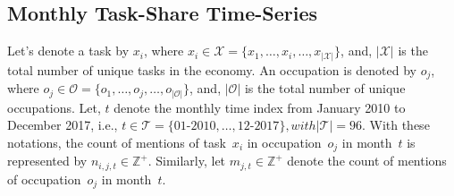 \documentclass[letterpaper]{article} %
\begin{document}
\subsection{Monthly Task-Share Time-Series}
\label{subsec:monthly_taskshare}
Let's denote a task by $x_i$, where $x_i \in \mathcal{X} = \{ x_1, \hdots, x_i, \hdots, x_{|\mathcal{X}|}\}$, and, $|\mathcal{X}|$ is the total number of unique tasks in the economy. An occupation is denoted by $o_j$, where $o_j \in \mathcal{O} = \{ o_1, \hdots, o_j, \hdots, o_{|\mathcal{O}|}\}$, and, $|\mathcal{O}|$ is the total number of unique occupations. Let, $t$ denote the monthly time index from January 2010 to December 2017, i.e., $t \in \mathcal{T} = \{ 01\text{-}2010, \hdots, 12\text{-}2017 \}, with |\mathcal{T}|=96 $. With these notations, the count of mentions of task~$x_i$ in occupation~$o_j$ in month~$t$ is represented by $n_{i,j,t} \in \mathbb{Z}^{+}$. Similarly, let $m_{j,t} \in \mathbb{Z}^{+}$ denote the count of mentions of occupation~$o_j$ in month~$t$.
\end{document}
